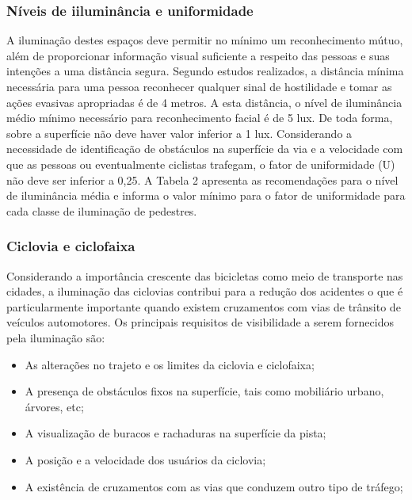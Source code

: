 \subsubsection{N\'iveis de iilumin\^ancia e uniformidade}

A ilumina\c{c}\~ao destes espa\c{c}os deve permitir no m\'inimo um reconhecimento m\'utuo, al\'em de proporcionar informa\c{c}\~ao visual suficiente a respeito das pessoas e suas inten\c{c}\~oes a uma dist\^ancia segura. Segundo estudos realizados, a dist\^ancia m\'inima necess\'aria para uma pessoa reconhecer qualquer sinal de hostilidade e tomar as a\c{c}\~oes evasivas apropriadas \'e de 4 metros. A esta dist\^ancia, o n\'ivel de ilumin\^ancia m\'edio m\'inimo necess\'ario para reconhecimento facial \'e de 5 lux. De toda forma, sobre a superf\'icie n\~ao deve haver valor inferior a 1 lux. Considerando a necessidade de identifica\c{c}\~ao de obst\'aculos na superf\'icie da via e a velocidade com que as pessoas ou eventualmente ciclistas trafegam, o fator de uniformidade (U) n\~ao deve ser inferior a 0,25. A Tabela 2 apresenta as recomenda\c{c}\~oes para o n\'ivel de ilumin\^ancia m\'edia e informa o valor m\'inimo para o fator de uniformidade para cada classe de ilumina\c{c}\~ao de pedestres. \cite{CemigMinas}

\subsubsection{Ciclovia e ciclofaixa}

Considerando a import\^ancia crescente das bicicletas como meio de transporte nas cidades, a ilumina\c{c}\~ao das ciclovias contribui para a redu\c{c}\~ao dos acidentes o que \'e particularmente importante quando existem cruzamentos com vias de tr\^ansito de ve\'iculos automotores. Os principais requisitos de visibilidade a serem fornecidos pela ilumina\c{c}\~ao s\~ao:

\begin{itemize}
        \item As altera\c{c}\~oes no trajeto e os limites da ciclovia e ciclofaixa; 
        \item A presen\c{c}a de obst\'aculos fixos na superf\'icie, tais como mobili\'ario urbano, \'arvores, etc;
	\item A visualiza\c{c}\~ao de buracos e rachaduras na superf\'icie da pista;
	\item A posi\c{c}\~ao e a velocidade dos usu\'arios da ciclovia;
	\item A exist\^encia de cruzamentos com as vias que conduzem outro tipo de tr\'afego;
\end{itemize}

